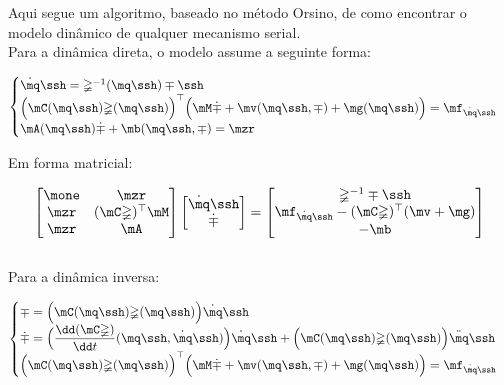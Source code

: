 Aqui segue um algoritmo, baseado no m\'etodo Orsino, de como encontrar o modelo din\^amico de qualquer mecanismo serial. \\

Para a din\^amica direta, o modelo assume a seguinte forma:

\begin{equation} \label{eq:SerialDinamics}
\begin{cases}
\dot{\mq}\ssh = \mathbb{\Psi}^{-1}(\mq\ssh) \mp\ssh \\
\Big( \mC(\mq\ssh) \mathbb{\Psi} (\mq\ssh) \Big)^\top \Big( \mM \dot{\mp} + \mv (\mq\ssh,\mp) + \mg (\mq\ssh) \Big) = \mf_{\dot{\mq}\ssh} \\
\mA (\mq\ssh) \dot{\mp} + \mb (\mq\ssh,\mp) = \mzr
\end{cases}
\end{equation}

Em forma matricial:

\begin{equation} \label{eq:SerialDinamicsMatrix}
\begin{bmatrix}
\mone & \mzr \\
\mzr & ( \mC \mathbb{\Psi})^\top \mM \\
\mzr & \mA \\
\end{bmatrix}
\begin{bmatrix}
\dot{\mq}\ssh \\
\dot{\mp} \\
\end{bmatrix}
=
\begin{bmatrix}
\mathbb{\Psi}^{-1} \mp\ssh \\
 \mf_{\dot{\mq}\ssh} - ( \mC \mathbb{\Psi})^\top (\mv + \mg) \\
-\mb \\
\end{bmatrix}
\end{equation} \\

Para a din\^amica inversa:

\begin{equation} \label{eq:SerialInverseDinamics}
\begin{cases}
\mp = \Big( \mC(\mq\ssh) \mathbb{\Psi} (\mq\ssh) \Big) \dot{\mq}\ssh \\
\dot{\mp} = \Big( \displaystyle\frac{\dd (\mC \mathbb{\Psi})}{\dd t} (\mq\ssh, \dot{\mq}\ssh) \Big) \dot{\mq}\ssh + \Big( \mC(\mq\ssh) \mathbb{\Psi} (\mq\ssh) \Big) \ddot{\mq}\ssh \\
\Big( \mC(\mq\ssh) \mathbb{\Psi} (\mq\ssh) \Big)^\top \Big( \mM \dot{\mp} + \mv (\mq\ssh,\mp) + \mg (\mq\ssh) \Big) = \mf_{\dot{\mq}\ssh} \\
\end{cases}
\end{equation}



